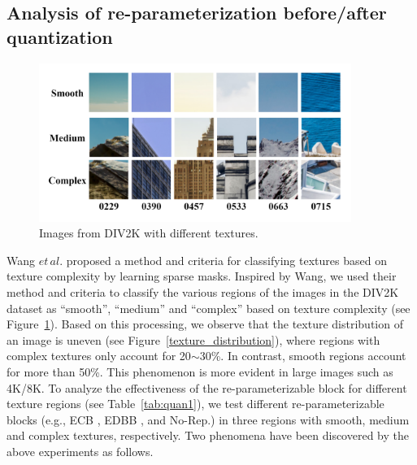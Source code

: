 \documentclass[sn-mathphys]{sn-jnl}%
\theoremstyle{thmstyleone}%
\theoremstyle{thmstyletwo}%
\theoremstyle{thmstylethree}%
\begin{document}
\subsection{Analysis of re-parameterization before/after quantization}
\begin{table}[htbp]
    \centering
    \caption{PSNRs of re-parameterizable blocks in different texture regions. Text: Before/After quantification.}
    \label{tab:quan1}
\end{table}

\begin{figure}[H]
    \begin{center}
    \includegraphics[width=4in]{texture.png}
    \caption{Images from DIV2K with different textures.}
    \label{texture}
    \end{center}
\end{figure} 

Wang $et\,al.$ \cite{SMSR} proposed a method and criteria for classifying textures based on texture complexity by learning sparse masks. Inspired by Wang, we used their method and criteria to classify the various regions of the images in the DIV2K \cite{Div2K} dataset as ``smooth'', ``medium'' and ``complex'' based on texture complexity (see Figure~\ref{texture}). Based on this processing, we observe that the texture distribution of an image is uneven (see Figure~\ref{texture_distribution}), where regions with complex textures only account for 20$\sim$30\%. In contrast, smooth regions account for more than 50\%. This phenomenon is more evident in large images such as 4K/8K. To analyze the effectiveness of the re-parameterizable block for different texture regions (see Table~\ref{tab:quan1}), we test different re-parameterizable blocks (e.g., ECB \cite{ECB}, EDBB \cite{EDBB}, and No-Rep.) in three regions with smooth, medium and complex textures, respectively. Two phenomena have been discovered by the above experiments as follows.
\end{document}

